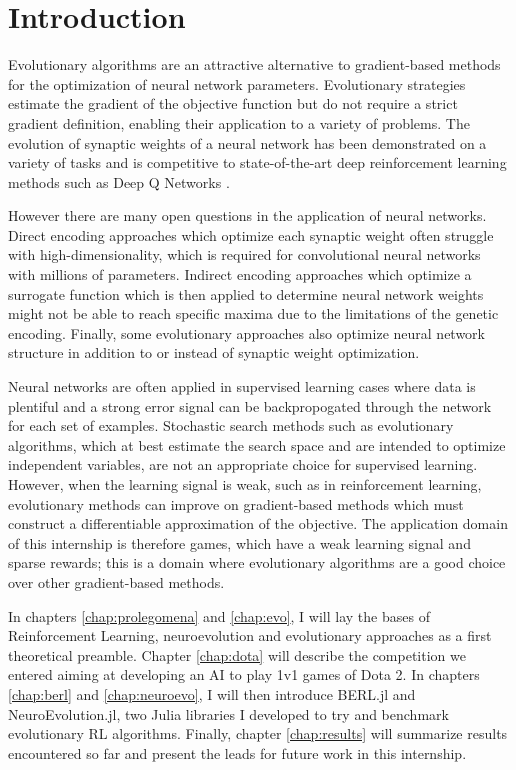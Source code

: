 \chapter*{Introduction}
\label{chap:introduction}

Evolutionary algorithms are an attractive alternative to gradient-based methods for the optimization of neural network parameters. Evolutionary strategies \cite{natural-evo-strat} estimate the gradient of the objective function but do not require a strict gradient definition, enabling their application to a variety of problems. The evolution of synaptic weights of a neural network has been demonstrated on a variety of tasks \cite{deep_neuroevo} and is competitive to state-of-the-art deep reinforcement learning methods such as Deep Q Networks \cite{human-lvl-control}. 

However there are many open questions in the application of neural networks. Direct encoding approaches which optimize each synaptic weight often struggle with high-dimensionality, which is required for convolutional neural networks with millions of parameters. Indirect encoding approaches which optimize a surrogate function which is then applied to determine neural network weights might not be able to reach specific maxima due to the limitations of the genetic encoding. Finally, some evolutionary approaches also optimize neural network structure in addition to or instead of synaptic weight optimization. 

Neural networks are often applied in supervised learning cases where data is plentiful and a strong error signal can be backpropogated through the network for each set of examples. Stochastic search methods such as evolutionary algorithms, which at best estimate the search space and are intended to optimize independent variables, are not an appropriate choice for supervised learning. However, when the learning signal is weak, such as in reinforcement learning, evolutionary methods can improve on gradient-based methods which must construct a differentiable approximation of the objective. The application domain of this internship is therefore games, which have a weak learning signal and sparse rewards; this is a domain where evolutionary algorithms are a good choice over other gradient-based methods.


In chapters \ref{chap:prolegomena} and \ref{chap:evo}, I will lay the bases of Reinforcement Learning, neuroevolution and evolutionary approaches as a first theoretical preamble. Chapter \ref{chap:dota} will describe the competition we entered aiming at developing an AI to play 1v1 games of Dota 2. In chapters \ref{chap:berl} and \ref{chap:neuroevo}, I will then introduce BERL.jl and NeuroEvolution.jl, two Julia libraries I developed to try and benchmark evolutionary RL algorithms. 
Finally, chapter \ref{chap:results} will summarize results encountered so far and present the leads for future work in this internship.


